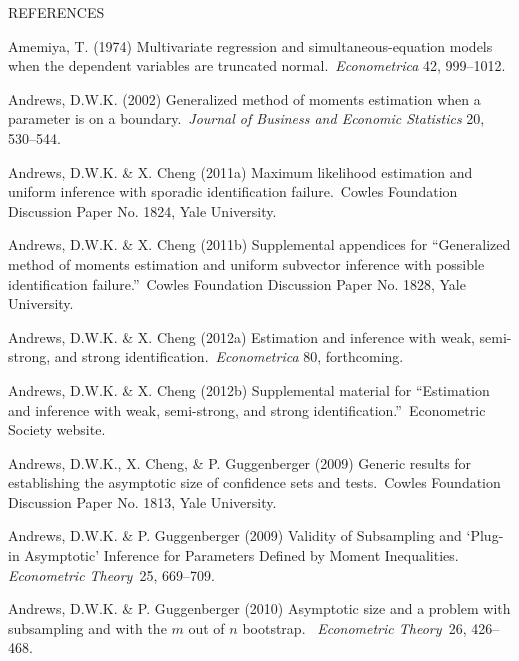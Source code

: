 \documentclass[12pt,titlepage,final,oneside,letterpaper]{article}
\begin{document}
\newpage

\begin{center}
{\LARGE R}{\Large EFERENCES}
\end{center}

\begin{description}
\item Amemiya, T. (1974) Multivariate regression and simultaneous-equation
models when the dependent variables are truncated normal.\ \emph{Econometrica%
} 42, 999--1012.

\item Andrews, D.W.K. (2002) Generalized method of moments estimation when a
parameter is on a boundary.\ \emph{Journal of Business and Economic
Statistics} 20, 530--544.

\item Andrews, D.W.K. \& X. Cheng (2011a) Maximum likelihood estimation and
uniform inference with sporadic identification failure.\ Cowles Foundation
Discussion Paper No. 1824, Yale University.

\item Andrews, D.W.K. \& X. Cheng (2011b) Supplemental appendices for
\textquotedblleft Generalized method of moments estimation and uniform
subvector inference with possible identification failure.\textquotedblright\
Cowles Foundation Discussion Paper No. 1828, Yale University.

\item Andrews, D.W.K. \& X. Cheng (2012a) Estimation and inference with
weak, semi-strong, and strong identification.\ \emph{Econometrica }80,
forthcoming.

\item Andrews, D.W.K. \& X. Cheng (2012b) Supplemental material for
\textquotedblleft Estimation and inference with weak, semi-strong, and
strong identification.\textquotedblright\ Econometric Society website.

\item Andrews, D.W.K., X. Cheng, \& P. Guggenberger (2009) Generic results
for establishing the asymptotic size of confidence sets and tests.\ Cowles
Foundation Discussion Paper No. 1813, Yale University.

\item Andrews, D.W.K. \& P. Guggenberger (2009) Validity of Subsampling and
`Plug-in Asymptotic' Inference for Parameters Defined by Moment
Inequalities. \emph{Econometric Theory}\textit{\ }25, 669--709.

\item Andrews, D.W.K. \& P. Guggenberger (2010) Asymptotic size and a
problem with subsampling and with the $m$ out of $n$ bootstrap.\ \emph{%
Econometric Theory}\textit{\ }26, 426--468.


\end{description}
\end{document}
